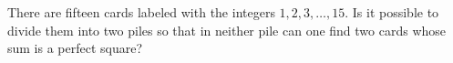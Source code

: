 There are fifteen cards labeled with the integers $1, 2, 3, \ldots, 15$. Is it possible to divide them into two piles so that in neither pile can one find two cards whose sum is a perfect square?
